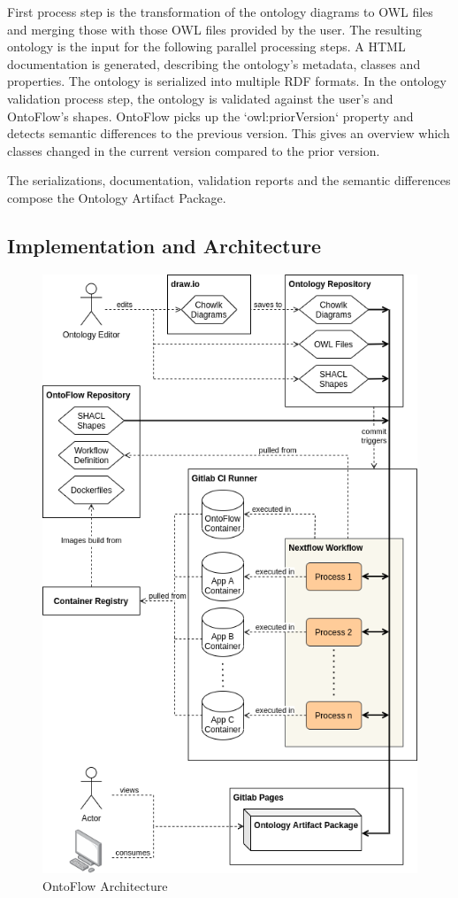 \documentclass[sigconf]{acmart}
\begin{document}
First process step is the transformation of the ontology diagrams to OWL files and merging those with those OWL files provided by the user.
The resulting ontology is the input for the following parallel processing steps.
A HTML documentation is generated, describing the ontology's metadata, classes and properties.
The ontology is serialized into multiple RDF formats.
In the ontology validation process step, the ontology is validated against the user's and OntoFlow's shapes.
OntoFlow picks up the `owl:priorVersion` property and detects semantic differences to the previous version. This gives an overview which classes changed in the current version compared to the prior version.

The serializations, documentation, validation reports and the semantic differences compose the Ontology Artifact Package.

\subsection{Implementation and Architecture}

\begin{figure}[ht]
  \centering
  \includegraphics[scale=0.4]{architecture.png}
  \caption{OntoFlow Architecture}
  \label{fig2}
\end{figure}
\end{document}
